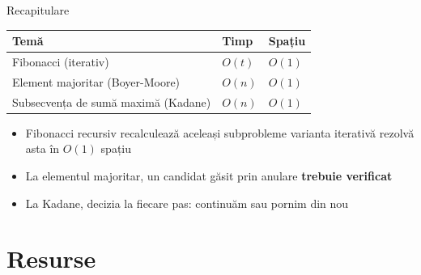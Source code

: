 \documentclass{beamer}
\begin{document}
\begin{frame}{Recapitulare}
  \begin{center}
  \begin{tabular}{lll}
    \toprule
    Temă & Timp & Spațiu \\
    \midrule
    Fibonacci (iterativ)              & $O(t)$ & $O(1)$ \\
    Element majoritar (Boyer-Moore)   & $O(n)$ & $O(1)$ \\
    Subsecvența de sumă maximă (Kadane) & $O(n)$ & $O(1)$ \\
    \bottomrule
  \end{tabular}
  \end{center}

  \smallskip
  \begin{itemize}
    \item Fibonacci recursiv recalculează aceleași subprobleme \textemdash{} varianta iterativă rezolvă asta în $O(1)$ spațiu
    \item La elementul majoritar, un candidat găsit prin anulare \textbf{trebuie verificat}
    \item La Kadane, decizia la fiecare pas: continuăm sau pornim din nou
  \end{itemize}
\end{frame}

\section{Resurse}
\end{document}
